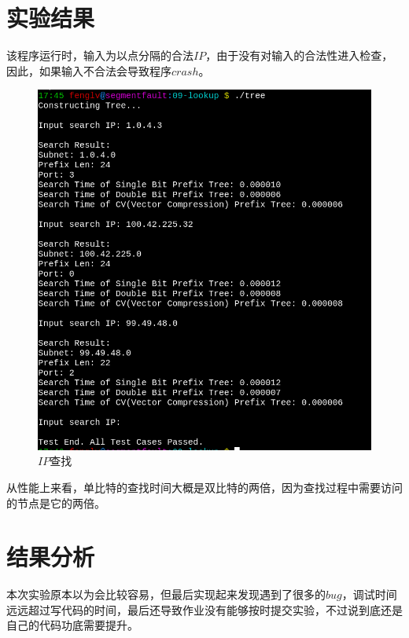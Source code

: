 \documentclass[UTF8,noindent]{ctexart}
\begin{document}
\section*{{实验结果}}
该程序运行时，输入为以点分隔的合法$IP$，由于没有对输入的合法性进入检查，因此，如果输入不合法会导致程序$crash$。
\begin{figure}[H]
  \centering
  \includegraphics[scale = 0.5]{1.png}
  \caption{$IP$查找}
\end{figure}

从性能上来看，单比特的查找时间大概是双比特的两倍，因为查找过程中需要访问的节点是它的两倍。

\section*{{结果分析}}
本次实验原本以为会比较容易，但最后实现起来发现遇到了很多的$bug$，调试时间远远超过写代码的时间，最后还导致作业没有能够按时提交实验，不过说到底还是自己的代码功底需要提升。
\end{document}
